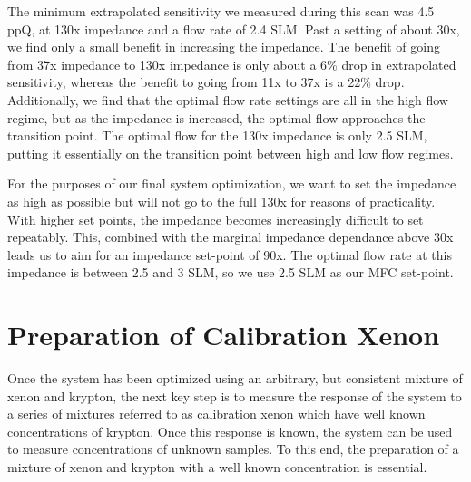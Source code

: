 The minimum extrapolated sensitivity we measured during this scan was 4.5 ppQ, at 130x impedance and a flow rate of 2.4 SLM. Past a setting of about 30x, we find only a small benefit in increasing the impedance. The benefit of going from 37x impedance to 130x impedance is only about a 6\% drop in extrapolated sensitivity, whereas the benefit to going from 11x to 37x is a 22\% drop. Additionally, we find that the optimal flow rate settings are all in the high flow regime, but as the impedance is increased, the optimal flow approaches the transition point. The optimal flow for the 130x impedance is only 2.5 SLM, putting it essentially on the transition point between high and low flow regimes.

For the purposes of our final system optimization, we want to set the impedance as high as possible but will not go to the full 130x for reasons of practicality. With higher set points, the impedance becomes increasingly difficult to set repeatably. This, combined with the marginal impedance dependance above 30x leads us to aim for an impedance set-point of 90x. The optimal flow rate at this impedance is between 2.5 and 3 SLM, so we use 2.5 SLM as our MFC set-point.



\section{Preparation of Calibration Xenon}
\label{sec:calprep}
Once the system has been optimized using an arbitrary, but consistent mixture of xenon and krypton, the next key step is to measure the response of the system to a series of mixtures referred to as calibration xenon which have well known concentrations of krypton. Once this response is known, the system can be used to measure concentrations of unknown samples. To this end, the preparation of a mixture of xenon and krypton with a well known concentration is essential.

